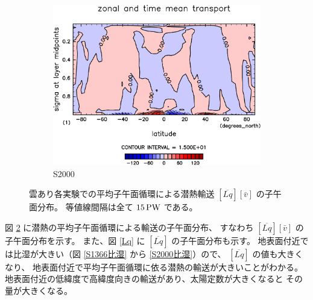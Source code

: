 \documentclass[body]{subfiles}
\begin{document}
\begin{figure}[t]
\begin{subfigure}{.4\textwidth}
		\includegraphics[width=\textwidth]{S2000/MeriHeatTransTest@latentEn_M,time=7300:7665-crop-rotate.pdf}
		\caption{S2000}\label{潜熱平均子午面循環S2000}
	\end{subfigure}
	\caption[雲あり各実験での平均子午面循環による潜熱輸送の子午面分布]{
		雲あり各実験での平均子午面循環による潜熱輸送 \([\overline{Lq}][\bar v]\) の子午面分布。
		等値線間隔は全て \(15\hmu{PW}\) である。
	}\label{潜熱平均子午面循環}
\end{figure}

\afterpage{\clearpage}

図 \ref{潜熱平均子午面循環} に潜熱の平均子午面循環による輸送の子午面分布、
すなわち \([\overline{Lq}][\bar v]\) の子午面分布を示す。
また、図 \ref{Lq} に \([\overline{Lq}]\) の子午面分布も示す。
地表面付近では比湿が大きい（図 \ref{S1366比湿} から \ref{S2000比湿}）ので、
\([\overline{Lq}]\) の値も大きくなり、
地表面付近で平均子午面循環に依る潜熱の輸送が大きいことがわかる。
地表面付近の低緯度で高緯度向きの輸送があり、太陽定数が大きくなると
その量が大きくなる。
\end{document}

